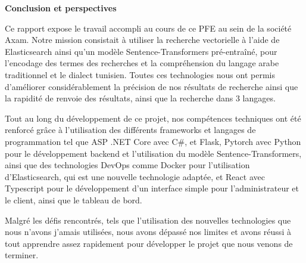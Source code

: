     
\begin{center}
    \LARGE
    \textbf{ Conclusion et perspectives}
\end{center}
\noindent
Ce rapport expose le travail accompli au cours de ce PFE au sein de la société Axam. Notre mission consistait à utiliser la recherche vectorielle à l'aide de Elasticsearch ainsi qu'un modèle Sentence-Transformers pré-entraîné, pour l'encodage des termes des recherches et la compréhension du langage arabe traditionnel et le dialect tunisien. Toutes ces technologies nous ont permis d'améliorer considérablement la précision de nos résultats de recherche ainsi que la rapidité de renvoie des résultats, ainsi que la recherche dans 3 langages.

\vspace*{0.5cm} 
\noindent
Tout au long du développement de ce projet, nos compétences techniques ont été renforcé grâce à l'utilisation des différents frameworks et langages de programmation tel que ASP .NET Core avec C\#, et Flask, Pytorch avec Python pour le développement backend et l'utilisation du modèle Sentence-Transformers, ainsi que des technologies DevOps comme Docker pour l'utilisation d'Elasticsearch, qui est une nouvelle technologie adaptée, et React avec Typescript pour le développement d'un interface simple pour l'administrateur et le client, ainsi que le tableau de bord.

\vspace*{0.5cm}
\noindent
Malgré les défis rencontrés, tels que l'utilisation des nouvelles technologies que nous n'avons j'amais utilisées, nous avons dépassé nos limites et avons réussi à tout apprendre assez rapidement pour développer le projet que nous venons de terminer.